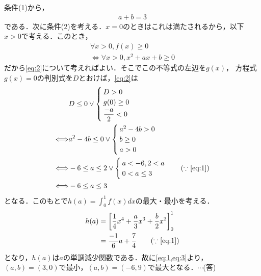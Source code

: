 \documentclass[../../main.tex]{subfiles}
\begin{document}
条件(1)から，
\begin{align}
  a+b=3 \label{eq:1}
\end{align}
である．次に条件(2)を考える．$x=0$のときはこれは満たされるから，以下$x>0$で考える．このとき，
\begin{align}
  \forall x>0,f(x)\ge0 \nonumber\\
  \Longleftrightarrow \forall x>0,x^2+ax+b\ge0 \label{eq:2}
\end{align}
だから\cref{eq:2}について考えればよい．そこでこの不等式の左辺を$g(x)$，
方程式$g(x)=0$の判別式を$D$とおけば，\cref{eq:2}は
\begin{align}
  &D\le0 \lor
  \begin{cases}
    D>0  \\
    g(0)\ge0 \\
    \dfrac{-a}{2}< 0
  \end{cases} \\
  \Longleftrightarrow
  &a^2-4b\le 0 \lor
  \begin{cases}
    a^2-4b>0  \\
    b\ge0 \\
    a>0
  \end{cases} \\
  \Longleftrightarrow
  &-6\le a\le2 \lor
  \begin{cases}
    a<-6,2<a  \\
    0<a\le3
  \end{cases} \quad (\because\text{\cref{eq:1}}) \\
  \Longleftrightarrow
  &-6\le a\le 3 \label{eq:3}
\end{align}
となる．このもとで$h(a)=\int_0^1f(x)dx$の最大・最小を考える．
\begin{align}
  h(a)&=\left[ \dfrac{1}{4}x^4+\dfrac{a}{3}x^3+\dfrac{b}{2}x^2\right]_0^1 \\
  &=\dfrac{-1}{6}a+\dfrac{7}{4}\tag{$\because\cref{eq:1}$}
\end{align}
となり，$h(a)$は$a$の単調減少関数である．故に\cref{eq:1,eq:3}より，$(a,b)=(3,0)$で最小，$(a,b)=(-6,9)$で最大となる．$\cdots$(答)
\end{document}
